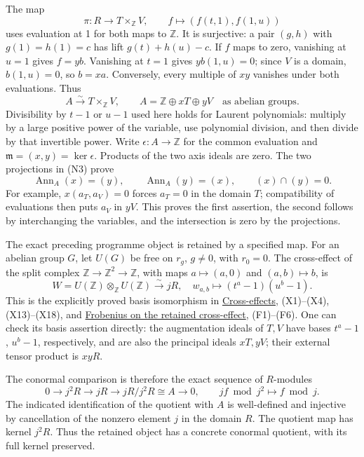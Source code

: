 \documentclass[
]{article}
\begin{document}
The map \[
\pi:R\longrightarrow T\times_{\mathbb Z}V,
\qquad f\longmapsto(f(t,1),f(1,u))
\tag{N2}
\] uses evaluation at 1 for both maps to \(\mathbb Z\). It is
surjective: a pair \((g,h)\) with \(g(1)=h(1)=c\) has lift
\(g(t)+h(u)-c\). If \(f\) maps to zero, vanishing at \(u=1\) gives
\(f=yb\). Vanishing at \(t=1\) gives \(yb(1,u)=0\); since \(V\) is a
domain, \(b(1,u)=0\), so \(b=xa\). Conversely, every multiple of \(xy\)
vanishes under both evaluations. Thus \[
A\xrightarrow{\sim}T\times_{\mathbb Z}V,
\qquad A=\mathbb Z\oplus xT\oplus yV
\quad\text{as abelian groups}.
\tag{N3}
\] Divisibility by \(t-1\) or \(u-1\) used here holds for Laurent
polynomials: multiply by a large positive power of the variable, use
polynomial division, and then divide by that invertible power. Write
\(\epsilon:A\to\mathbb Z\) for the common evaluation and
\(\mathfrak m=(x,y)=\ker\epsilon\). Products of the two axis ideals are
zero. The two projections in (N3) prove \[
\operatorname{Ann}_A(x)=(y),\qquad
\operatorname{Ann}_A(y)=(x),\qquad (x)\cap(y)=0.
\tag{N4}
\] For example, \(x(a_T,a_V)=0\) forces \(a_T=0\) in the domain \(T\);
compatibility of evaluations then puts \(a_V\) in \(yV\). This proves
the first assertion, the second follows by interchanging the variables,
and the intersection is zero by the projections.

The exact preceding programme object is retained by a specified map. For
an abelian group \(G\), let \(U(G)\) be free on \(r_g\), \(g\ne0\), with
\(r_0=0\). The cross-effect of the split complex
\(\mathbb Z\to\mathbb Z^2\to\mathbb Z\), with maps \(a\mapsto(a,0)\) and
\((a,b)\mapsto b\), is \[
W=U(\mathbb Z)\otimes_{\mathbb Z}U(\mathbb Z)
\xrightarrow{\sim}jR,
\quad w_{a,b}\longmapsto(t^a-1)(u^b-1).
\tag{N5}
\] This is the explicitly proved basis isomorphism in
\href{https://github.com/KokunoYumeto/zeta-function-research-reader/blob/6af54ea3c8ef99127af327f3103e086c68d482c2/workbenches/splitzero-tandem/branches/identity-absorber-square/CROSS_EFFECTS.md}{Cross-effects},
(X1)--(X4), (X13)--(X18), and
\href{https://github.com/KokunoYumeto/zeta-function-research-reader/blob/6af54ea3c8ef99127af327f3103e086c68d482c2/workbenches/splitzero-tandem/branches/identity-absorber-square/FROBENIUS_CROSS_EFFECT.md}{Frobenius
on the retained cross-effect}, (F1)--(F6). One can check its basis
assertion directly: the augmentation ideals of \(T,V\) have bases
\(t^a-1\), \(u^b-1\), respectively, and are also the principal ideals
\(xT,yV\); their external tensor product is \(xyR\).

The conormal comparison is therefore the exact sequence of \(R\)-modules
\[
0\longrightarrow j^2R\longrightarrow jR
\longrightarrow jR/j^2R\cong A\longrightarrow0,
\qquad jf\bmod j^2\longmapsto f\bmod j.
\tag{N6}
\] The indicated identification of the quotient with \(A\) is
well-defined and injective by cancellation of the nonzero element \(j\)
in the domain \(R\). The quotient map has kernel \(j^2R\). Thus the
retained object has a concrete conormal quotient, with its full kernel
preserved.
\end{document}
